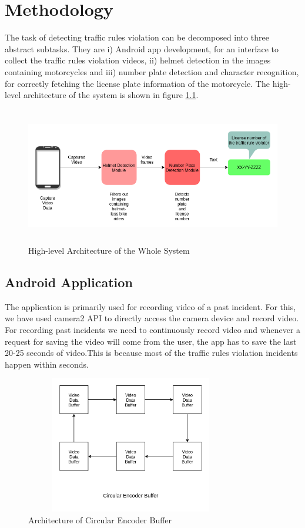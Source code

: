 \chapter{Methodology}
The task of detecting traffic rules violation can be decomposed into three abstract subtasks. They are i) Android app development, for an interface to collect the traffic rules violation videos, ii) helmet detection in the images containing motorcycles and iii) number plate detection and character recognition, for correctly fetching the license plate information of the motorcycle. The high-level architecture of the system is shown in figure \ref{fig0}.
\begin{figure}[!htb]
\centerline{\includegraphics[height=60mm,width=132mm]{img/rd0.png}}
\caption{High-level Architecture of the Whole System}
\label{fig0}
\end{figure}

\section{Android Application}

The application is primarily used for recording video of a past incident. For this, we have used camera2 API \cite{b11} to directly access the camera device and record video. For recording past incidents we need to continuously record video and whenever a request for saving the video will come from the user, the app has to save the last 20-25 seconds of video.This is because most of the traffic rules violation incidents happen within seconds.
\begin{figure}[!htb]
\centerline{\includegraphics[height=60mm,width=92mm]{img/rd1.png}}
\caption{Architecture of Circular Encoder Buffer}
\label{fig1}
\end{figure}

